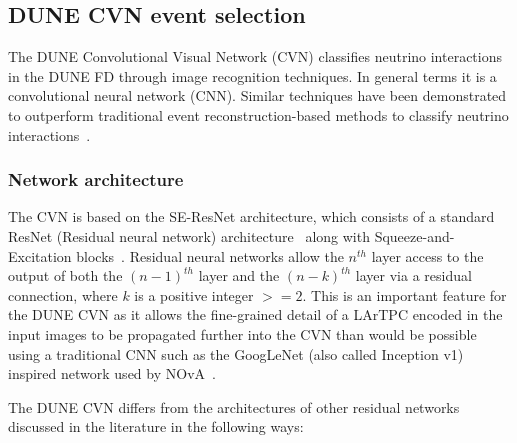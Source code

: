 
\subsection{DUNE CVN event selection}
The DUNE Convolutional Visual Network (CVN) classifies neutrino interactions in the DUNE FD through image recognition techniques. In general terms it is a convolutional neural network (CNN). Similar techniques have been demonstrated to outperform traditional event reconstruction-based methods to classify neutrino interactions~\cite{novacvn}.

\subsubsection{Network architecture}
The CVN is based on the SE-ResNet architecture, which consists of a standard ResNet (Residual neural network) architecture~\cite{He-et-al-2015-deep} along with Squeeze-and-Excitation blocks~\cite{Hu-et-al-2017-squeeze}. Residual neural networks allow the $n^{th}$ layer access to the output of both the $(n-1)^{th}$ layer and the $(n-k)^{th}$ layer via a residual connection, where $k$ is a positive integer $>=2$. This is an important feature for the DUNE CVN as it allows the fine-grained detail of a LArTPC encoded in the input images to be propagated further into the CVN than would be possible using a traditional CNN such as the GoogLeNet (also called Inception v1)~\cite{GoogLeNet} inspired network used by NOvA~\cite{novacvn}.

The DUNE CVN differs from the architectures of other residual networks discussed in the literature in the following ways:

